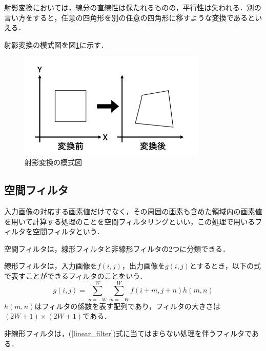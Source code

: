 \documentclass[openright]{nitocs}
\numberwithin{equation}{section}
\begin{document}
            射影変換においては，線分の直線性は保たれるものの，平行性は失われる．別の言い方をすると，任意の四角形を別の任意の四角形に移すような変換であるといえる．

            射影変換の模式図を図\ref{sample_homography}に示す．

            \begin{figure}[tb] %
                \begin{center}
                \includegraphics[clip,width=90mm]{Homography.jpg} 
                \caption{射影変換の模式図}
                \label{sample_homography}
                \end{center}
            \end{figure}
    

        \subsection{空間フィルタ}
            入力画像の対応する画素値だけでなく，その周囲の画素も含めた領域内の画素値を用いて計算する処理のことを空間フィルタリングといい，この処理で用いるフィルタを空間フィルタという\cite{DIP}．
            
            空間フィルタは，線形フィルタと非線形フィルタの2つに分類できる．

            線形フィルタは，入力画像を$f(i,j)$，出力画像を$g(i,j)$とするとき，以下の式で表すことができるフィルタのことをいう．
            \begin{equation} \label{linear_filter}
                g(i,j) = \sum\limits_{n=-W}^{W}\sum\limits_{m=-W}^{W}f(i+m,j+n)h(m,n)
            \end{equation}
            $h(m,n)$はフィルタの係数を表す配列であり，フィルタの大きさは$(2W+1)\times(2W+1)$である．

            非線形フィルタは，(\ref{linear_filter})式に当てはまらない処理を伴うフィルタである．
\end{document}
